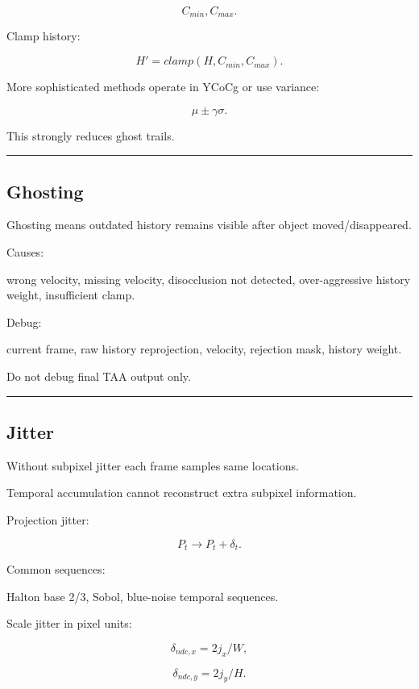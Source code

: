 \[
C_{min},C_{max}.
\]

Clamp history:

\[
\boxed{
H'
=
clamp(
H,
C_{min},
C_{max}
).
}
\]

More sophisticated methods operate in YCoCg or use variance:

\[
\mu\pm\gamma\sigma.
\]

This strongly reduces ghost trails.

\begin{center}\rule{0.5\linewidth}{0.5pt}\end{center}

\subsection{Ghosting}\label{04-visual-computing-ii-ch040-ghosting}

Ghosting means outdated history remains visible after object moved/disappeared.

Causes:

wrong velocity, missing velocity, disocclusion not detected, over-aggressive history weight, insufficient clamp.

Debug:

current frame, raw history reprojection, velocity, rejection mask, history weight.

Do not debug final TAA output only.

\begin{center}\rule{0.5\linewidth}{0.5pt}\end{center}

\subsection{Jitter}\label{04-visual-computing-ii-ch040-jitter}

Without subpixel jitter each frame samples same locations.

Temporal accumulation cannot reconstruct extra subpixel information.

Projection jitter:

\[
P_t
\rightarrow
P_t+\delta_t.
\]

Common sequences:

Halton base 2/3, Sobol, blue-noise temporal sequences.

Scale jitter in pixel units:

\[
\delta_{ndc,x}
=
2j_x/W,
\]

\[
\delta_{ndc,y}
=
2j_y/H.
\]

